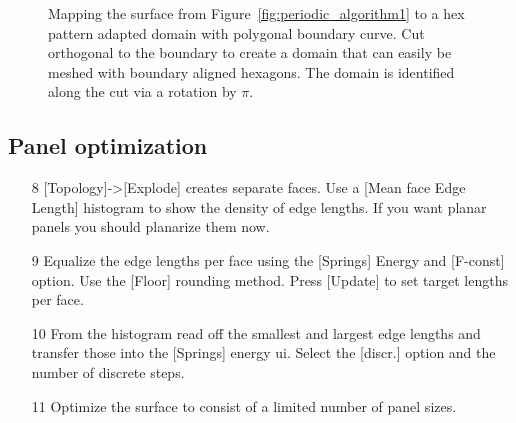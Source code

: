 \documentclass[Thesis.tex]{subfiles}
\begin{document}
\begin{figure}
\caption{Mapping the surface from Figure~\ref{fig:periodic_algorithm1} to a hex pattern adapted domain with polygonal boundary curve. Cut orthogonal to the boundary to create a domain that can easily be meshed with boundary aligned hexagons. The domain is identified along the cut via a rotation by $\pi$.}
\end{figure}

\subsection{Panel optimization}

\begin{itemize}
\item[8] [Topology]->[Explode] creates separate faces. Use a [Mean face Edge Length] histogram to show the density of edge lengths. If you want planar panels you should planarize them now. \\
\item[9] Equalize the edge lengths per face using the [Springs] Energy and [F-const] option. Use the [Floor] rounding method. Press [Update] to set target lengths per face.\\
\item[10] From the histogram read off the smallest and largest edge lengths and transfer those into the [Springs] energy ui. Select the [discr.] option and the number of discrete steps.
\item[11] Optimize the surface to consist of a limited number of panel sizes.\\
\end{itemize}
\end{document}
